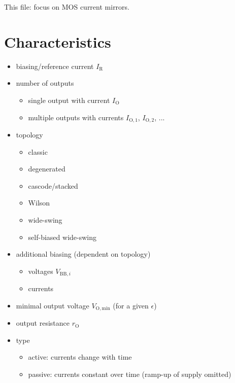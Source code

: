 \documentclass{article}[11pt]
\begin{document}
\notetitle

This file: focus on MOS current mirrors.

\section{Characteristics}

\begin{itemize}
  \item biasing/reference current $I_{\mathrm{R}}$
  
  \item number of outputs
    \begin{itemize}
      \item[-] single output with current $I_{\mathrm{O}}$
      \item[-] multiple outputs with currents $I_{\mathrm{O,1}}$, $I_{\mathrm{O,2}}$, ...
    \end{itemize}

  \item topology
    \begin{itemize}
      \item[-] classic
      \item[-] degenerated
      \item[-] cascode/stacked 
      \item[-] Wilson 
      \item[-] wide-swing
      \item[-] self-biased wide-swing
    \end{itemize}

  \item  additional biasing (dependent on topology)
    \begin{itemize}
      \item[-] voltages $V_{\mathrm{BB,}i}$ 
      \item[-] currents
    \end{itemize}

  \item minimal output voltage $V_{\mathrm{O,min}}$ (for a given $\epsilon$)

  \item output resistance $r_{\mathrm{O}}$

  \item type
    \begin{itemize}
      \item[-] active: currents change with time
      \item[-] passive: currents constant over time (ramp-up of supply omitted)  
    \end{itemize}


\end{itemize}
\end{document}
